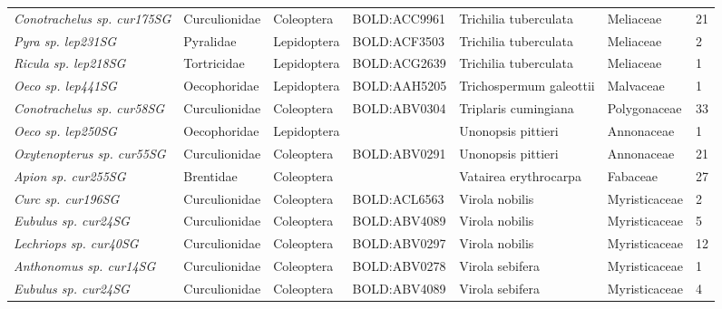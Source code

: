 \documentclass[11pt]{article}
\begin{document}
\begin{landscape}
\begin{longtable}{@{}lllllll@{}}
\textit{Conotrachelus sp. cur175SG}                   & Curculionidae   & Coleoptera   & BOLD:ACC9961 & Trichilia tuberculata              & Meliaceae        & 21    \\
\textit{Pyra sp. lep231SG}                            & Pyralidae       & Lepidoptera  & BOLD:ACF3503 & Trichilia tuberculata              & Meliaceae        & 2     \\
\textit{Ricula sp. lep218SG}                          & Tortricidae     & Lepidoptera  & BOLD:ACG2639 & Trichilia tuberculata              & Meliaceae        & 1     \\
\textit{Oeco sp. lep441SG}                            & Oecophoridae    & Lepidoptera  & BOLD:AAH5205 & Trichospermum galeottii            & Malvaceae        & 1     \\
\textit{Conotrachelus sp. cur58SG}                    & Curculionidae   & Coleoptera   & BOLD:ABV0304 & Triplaris cumingiana               & Polygonaceae     & 33    \\
\textit{Oeco sp. lep250SG}                            & Oecophoridae    & Lepidoptera  &              & Unonopsis pittieri                 & Annonaceae       & 1     \\
\textit{Oxytenopterus sp. cur55SG}                    & Curculionidae   & Coleoptera   & BOLD:ABV0291 & Unonopsis pittieri                 & Annonaceae       & 21    \\
\textit{Apion sp. cur255SG}                           & Brentidae       & Coleoptera   &              & Vatairea erythrocarpa              & Fabaceae         & 27    \\
\textit{Curc sp. cur196SG}                            & Curculionidae   & Coleoptera   & BOLD:ACL6563 & Virola nobilis                     & Myristicaceae    & 2     \\
\textit{Eubulus sp. cur24SG}                          & Curculionidae   & Coleoptera   & BOLD:ABV4089 & Virola nobilis                     & Myristicaceae    & 5     \\
\textit{Lechriops sp. cur40SG}                        & Curculionidae   & Coleoptera   & BOLD:ABV0297 & Virola nobilis                     & Myristicaceae    & 12    \\
\textit{Anthonomus sp. cur14SG}                       & Curculionidae   & Coleoptera   & BOLD:ABV0278 & Virola sebifera                    & Myristicaceae    & 1     \\
\textit{Eubulus sp. cur24SG}                          & Curculionidae   & Coleoptera   & BOLD:ABV4089 & Virola sebifera                    & Myristicaceae    & 4     \\

\end{longtable}
\end{landscape}
\end{document}
